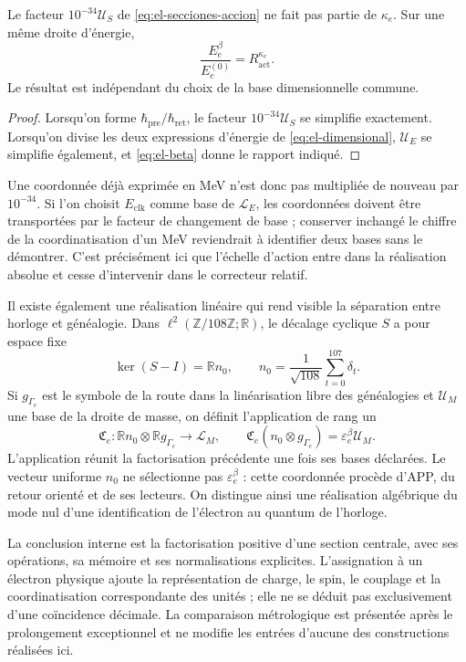 \begin{proposition}
Le facteur \(10^{-34}\mathcal U_S\) de \eqref{eq:el-secciones-accion} ne fait pas partie de \(\kappa_e\). Sur une même droite d'énergie,
\begin{equation}
 \frac{E_e^\beta}{E_e^{(0)}}=R_{\mathrm{act}}^{\kappa_e}.
 \label{eq:el-razon-energia}
\end{equation}
Le résultat est indépendant du choix de la base dimensionnelle
commune.
\end{proposition}
\begin{proof}
Lorsqu'on forme \(\hbar_{\mathrm{pre}}/\hbar_{\mathrm{ret}}\), le facteur
\(10^{-34}\mathcal U_S\) se simplifie exactement. Lorsqu'on divise les deux
expressions d'énergie de \eqref{eq:el-dimensional}, \(\mathcal U_E\) se simplifie
également, et \eqref{eq:el-beta} donne le rapport indiqué.
\end{proof}

Une coordonnée déjà exprimée en MeV n'est donc pas multipliée de nouveau
par \(10^{-34}\). Si l'on choisit \(E_{\mathrm{clk}}\) comme base de
\(\mathcal L_E\), les coordonnées doivent être transportées par le facteur
de changement de base ; conserver inchangé le chiffre de la coordinatisation d'un MeV
reviendrait à identifier deux bases sans le démontrer. C'est précisément ici
que l'échelle d'action entre dans la réalisation absolue et cesse
d'intervenir dans le correcteur relatif.

Il existe également une réalisation linéaire qui rend visible la séparation
entre horloge et généalogie. Dans
\(\ell^2(\mathbb Z/108\mathbb Z;\mathbb R)\), le décalage
cyclique \(S\) a pour espace fixe
\[
 \ker(S-I)=\mathbb R n_0,\qquad
 n_0=\frac1{\sqrt{108}}\sum_{t=0}^{107}\delta_t.
\]
Si \(g_{\Gamma_e}\) est le symbole de la route dans la linéarisation libre
des généalogies et \(\mathcal U_M\) une base de la droite de masse,
on définit l'application de rang un
\begin{equation}
 \mathfrak C_e:
 \mathbb R n_0\otimes\mathbb R g_{\Gamma_e}\longrightarrow\mathcal L_M,
 \qquad
 \mathfrak C_e(n_0\otimes g_{\Gamma_e})
 =\varepsilon_e^\beta\mathcal U_M.
 \label{eq:el-rango-uno}
\end{equation}
L'application réunit la factorisation précédente une fois ses bases déclarées.
Le vecteur uniforme \(n_0\) ne sélectionne pas \(\varepsilon_e^\beta\) :
cette coordonnée procède d'APP, du retour orienté et de ses lecteurs.
On distingue ainsi une réalisation algébrique du mode nul d'une
identification de l'électron au quantum de l'horloge.

La conclusion interne est la factorisation positive d'une section
centrale, avec ses opérations, sa mémoire et ses normalisations explicites.
L'assignation à un électron physique ajoute la représentation de charge, le
spin, le couplage et la coordinatisation correspondante des unités ; elle ne se
déduit pas exclusivement d'une coïncidence décimale. La comparaison
métrologique est présentée après le prolongement exceptionnel et ne modifie
les entrées d'aucune des constructions réalisées ici.




